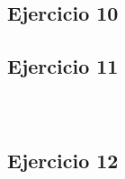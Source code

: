\documentclass[10pt,a4paper]{article}
\begin{document}
\subsubsection{}
    \begin{lstlisting}
    \end{lstlisting}
\subsubsection{}
    \begin{lstlisting}
    \end{lstlisting}
\subsubsection{}
    \begin{lstlisting}
    \end{lstlisting}
\subsection{Ejercicio 10}
\subsection{Ejercicio 11}
\subsubsection{}
    \begin{lstlisting}
    \end{lstlisting}
\subsubsection{}
    \begin{lstlisting}
    \end{lstlisting}
\subsection{Ejercicio 12}
\subsubsection{}
    \begin{lstlisting}
    \end{lstlisting}
\subsubsection{}
    \begin{lstlisting}
    \end{lstlisting}
\end{document}
